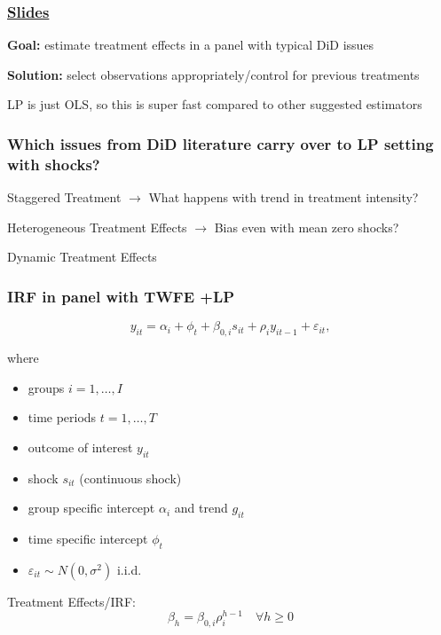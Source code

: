 \documentclass[notes,11pt, aspectratio = 169]{beamer}
\begin{document}
\begin{frame}\frametitle{\citet{dube2023local} \href{https://conference.nber.org/conf_papers/f172417.slides.pdf}{Slides}}

    \begin{wideitemize}
        \item \textbf{Goal:} estimate treatment effects in a panel with typical DiD issues
        \item \textbf{Solution:} select observations appropriately/control for previous treatments 
        \item LP is just OLS, so this is super fast compared to other suggested estimators           
    \end{wideitemize}
\end{frame}


\begin{frame}
    \frametitle{Which issues from DiD literature carry over to LP setting with shocks?}
        \begin{wideitemize}
            \item Staggered Treatment $\rightarrow$ What happens with trend in treatment intensity? 
            \item Heterogeneous Treatment Effects $\rightarrow$ Bias even with mean zero shocks? 
            \item Dynamic Treatment Effects 
        \end{wideitemize}

\end{frame}

\begin{frame}\frametitle{IRF in panel with TWFE +LP}
    \[ y_{it} = \alpha_i + \phi_t + \beta_{0,i} s_{it} +\rho_i y_{it-1} +\varepsilon_{it} , \] 
    \begin{wideitemize} 
\item where 
    \begin{itemize}
        \item groups  $i =1 , \dots, I$ 
        \item time periods $t = 1, \dots, T$ 
        \item outcome of interest $y_{it}$
        \item shock  $s_{it}$ (continuous shock)
        \item group specific intercept $\alpha_i$ and trend $g_{it}$
        \item time specific intercept $\phi_t$ 
        \item $\varepsilon_{it} \sim N(0, \sigma^2)$ i.i.d. 
    \end{itemize}
    \item  Treatment Effects/IRF:        \[\beta_h = \beta_{0,i} \rho_i^{h-1} \quad \forall h\geq0  \] 
  
\end{wideitemize}

\end{frame}
\end{document}
